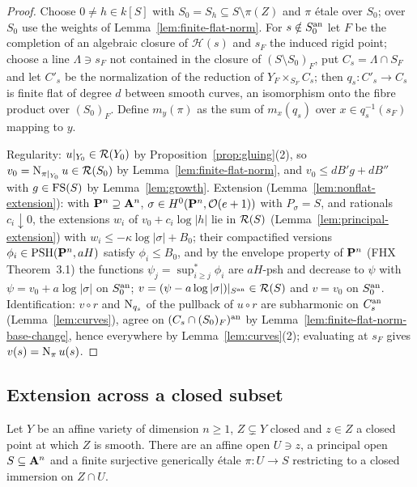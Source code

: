 \begin{proof}
Choose $0\ne h\in k[S]$ with $S_0=S_h\subseteq S\setminus\pi(Z)$ and $\pi$ \'etale over $S_0$; over
$S_0$ use the weights of Lemma~\ref{lem:finite-flat-norm}. For $s\notin S_0^{\mathrm{an}}$ let $F$ be the
completion of an algebraic closure of $\mathcal H(s)$ and $s_F$ the induced rigid point; choose a line
$\Lambda\ni s_F$ not contained in the closure of $(S\setminus S_0)_F$, put $C_s=\Lambda\cap S_F$ and let
$C'_s$ be the normalization of the reduction of $Y_F\times_{S_F}C_s$; then $q_s\colon C'_s\to C_s$ is
finite flat of degree $d$ between smooth curves, an isomorphism onto the fibre product over
$(S_0)_F$. Define $m_y(\pi)$ as the sum of $m_x(q_s)$ over $x\in q_s^{-1}(s_F)$ mapping to $y$.

Regularity: $u|_{Y_0}\in\mathcal{R}(Y_0)$ by Proposition~\ref{prop:gluing}(2), so
$v_0=\operatorname{N}_{\pi|_{Y_0}}u\in\mathcal{R}(S_0)$ by Lemma~\ref{lem:finite-flat-norm}, and
$v_0\le dB'g+dB''$ with $g\in\mathrm{FS}(S)$ by Lemma~\ref{lem:growth}. Extension (Lemma~\ref{lem:nonflat-extension}): with $\mathbf{P}^n\supseteq\mathbf{A}^n$,
$\sigma\in H^0(\mathbf{P}^n,\mathcal O(e+1))$ with $P_\sigma=S$, and rationals $c_i\downarrow0$, the extensions
$w_i$ of $v_0+c_i\log|h|$ lie in $\mathcal{R}(S)$ (Lemma~\ref{lem:principal-extension}) with
$w_i\le-\kappa\log|\sigma|+B_0$; their compactified versions $\phi_i\in\mathrm{PSH}(\mathbf{P}^n,aH)$ satisfy
$\phi_i\le B_0$, and by the envelope property of $\mathbf{P}^n$ (FHX Theorem~3.1) the functions
$\psi_j=\sup^*_{i\ge j}\phi_i$ are $aH$-psh and decrease to $\psi$ with $\psi=v_0+a\log|\sigma|$ on
$S_0^{\mathrm{an}}$; $v=(\psi-a\log|\sigma|)|_{S^{\mathrm{an}}}\in\mathcal{R}(S)$ and $v=v_0$ on $S_0^{\mathrm{an}}$. Identification:
$v\circ r$ and $\operatorname{N}_{q_s}$ of the pullback of $u\circ r$ are subharmonic on $C_s^{\mathrm{an}}$
(Lemma~\ref{lem:curves}), agree on $(C_s\cap(S_0)_F)^{\mathrm{an}}$ by
Lemma~\ref{lem:finite-flat-norm-base-change}, hence everywhere by Lemma~\ref{lem:curves}(2); evaluating at $s_F$
gives $v(s)=\operatorname{N}_\pi u(s)$.
\end{proof}

\subsection{Extension across a closed subset}\label{subsec:extension}

\begin{lemma}\label{lem:projection-existence}
\leanok
Let $Y$ be an affine variety of dimension $n\ge1$, $Z\subsetneq Y$ closed and $z\in Z$ a closed point
at which $Z$ is smooth. There are an affine open $U\ni z$, a principal open $S\subseteq\mathbf{A}^n$ and a
finite surjective generically \'etale $\pi\colon U\to S$ restricting to a closed immersion on
$Z\cap U$.
\end{lemma}

